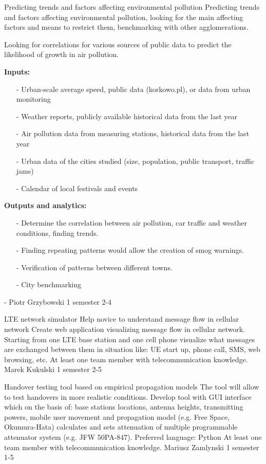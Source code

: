 \begin{project}
{Predicting trends and factors affecting environmental pollution}
{Predicting trends and factors affecting environmental pollution, looking for the main affecting factors and means to restrict them, benchmarking with other agglomerations.} 
{ 
Looking for correlations for various sources of public data to predict the likelihood of growth in air pollution.

\textbf{Inputs:}
\begin{itemize}
	\item[-] Urban-scale average speed, public data (korkowo.pl), or data from urban monitoring
	\item[-] Weather reports, publicly available historical data from the last year
	\item[-] Air pollution data from measuring stations, historical data from the last year
	\item[-] Urban data of the cities studied (size, population, public transport, traffic jams)
	\item[-] Calendar of local festivals and events
\end{itemize} 
\textbf{Outputs and analytics:}
\begin{itemize}
	\item[-] Determine the correlation between air pollution, car traffic and weather conditions, finding trends.
	\item[-] Finding repeating patterns would allow the creation of smog warnings.
	\item[-] Verification of patterns between different towns.
	\item[-] City benchmarking
\end{itemize} 
}
{-}
{Piotr Grzybowski}
{1 semester}
{2-4}
\end{project}
\begin{project}
{LTE network simulator}
{Help novice to understand message flow in cellular network} 
{ 
Create web application visualizing message flow in cellular network. Starting
from one LTE base station and one cell phone visualize what messages are exchanged between them 
in situation like: UE start up, phone call, SMS, web browsing, etc.
}
{At least one team member with telecommunication knowledge.}
{Marek Kukulski}
{1 semester}
{2-5}
\end{project}
\begin{project}
{Handover testing tool based on empirical propagation models}
{The tool will allow to test handovers in more realistic conditions.} 
{ 
Develop tool with GUI interface which on the basis of: base stations locations, antenna heights, transmitting powers, mobile user movement and propagation model (e.g. Free Space, Okumura-Hata) calculates and sets attenuation of multiple programmable attenuator system (e.g. JFW 50PA-847).
}
{Preferred language: Python\newline
At least one team member with telecommunication knowledge.}
{Mariusz Zamlynski}
{1 semester}
{1-5}
\end{project}
